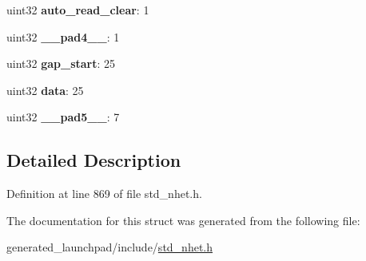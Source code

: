 \begin{DoxyCompactItemize}
\item 
\mbox{\label{structscnt__format_a3b5d4a01738c4da09cb07b36a713a4a8}} 
uint32 {\bfseries auto\+\_\+read\+\_\+clear}\+: 1
\item 
\mbox{\label{structscnt__format_a385b0b8bbd9b2ed37a02230b8252772c}} 
uint32 {\bfseries \+\_\+\+\_\+pad4\+\_\+\+\_\+}\+: 1
\item 
\mbox{\label{structscnt__format_a6310e203fc0d1db8c6fc27b8662bc7b5}} 
uint32 {\bfseries gap\+\_\+start}\+: 25
\item 
\mbox{\label{structscnt__format_aafe2f9c6c7a714c54c6b4a8b655660ec}} 
uint32 {\bfseries data}\+: 25
\item 
\mbox{\label{structscnt__format_a8e0ef0e06ab2277618ba792424fca5fb}} 
uint32 {\bfseries \+\_\+\+\_\+pad5\+\_\+\+\_\+}\+: 7
\end{DoxyCompactItemize}


\subsection{Detailed Description}


Definition at line 869 of file std\+\_\+nhet.\+h.



The documentation for this struct was generated from the following file\+:\begin{DoxyCompactItemize}
\item 
generated\+\_\+launchpad/include/\mbox{\hyperlink{std__nhet_8h}{std\+\_\+nhet.\+h}}\end{DoxyCompactItemize}
